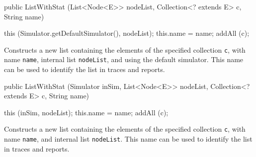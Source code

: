\begin{htmlonly}
\end{htmlonly}
\begin{code}

   public ListWithStat (List<Node<E>> nodeList, Collection<? extends E> c,
                        String name)\begin{hide} {
      this (Simulator.getDefaultSimulator(), nodeList);
      this.name = name;
      addAll (c);
   }\end{hide}
\end{code}
\begin{tabb} Constructs a new list containing the elements of the
   specified collection \texttt{c}, with name \texttt{name},
   internal list \texttt{nodeList}, and using the default simulator.
   This name can be used to identify the list in traces and reports.
\end{tabb}
\begin{htmlonly}
\end{htmlonly}
\begin{code}

   public ListWithStat (Simulator inSim, List<Node<E>> nodeList,
                        Collection<? extends E> c, String name)\begin{hide} {
      this (inSim, nodeList);
      this.name = name;
      addAll (c);
   }\end{hide}
\end{code}
\begin{tabb} Constructs a new list containing the elements of the
   specified collection \texttt{c}, with name \texttt{name}, and
   internal list \texttt{nodeList}.
   This name can be used to identify the list in traces and reports.
\end{tabb}
\begin{htmlonly}
\end{htmlonly}

